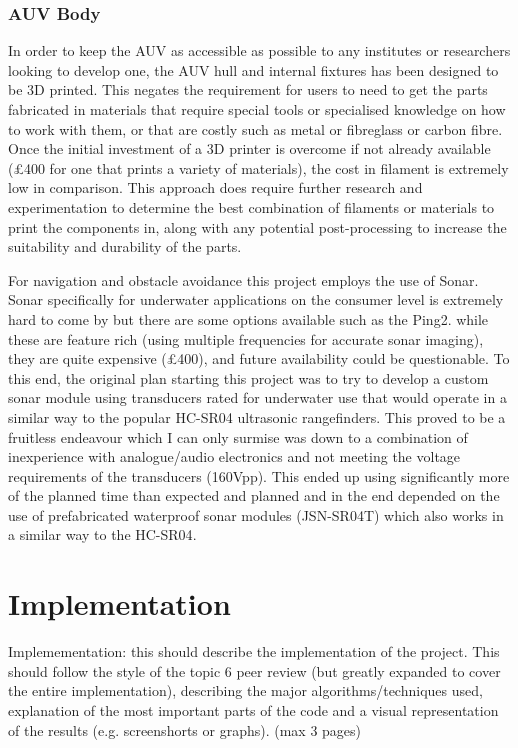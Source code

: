 \documentclass[11pt,a4paper,titlepage]{report}
\begin{document}
	\subsection*{AUV Body}
	In order to keep the AUV as accessible as possible to any institutes or researchers looking to develop one, the AUV hull and internal fixtures has been designed to be 3D printed. This negates the requirement for users to need to get the parts fabricated in materials that require special tools or specialised knowledge on how to work with them, or that are costly such as metal or fibreglass or carbon fibre. Once the initial investment of a 3D printer is overcome if not already available (\unit{\approx}£400 for one that prints a variety of materials), the cost in filament is extremely low in comparison. This approach does require further research and experimentation to determine the best combination of filaments or materials to print the components in, along with any potential post-processing to increase the suitability and durability of the parts. 
	
	For navigation and obstacle avoidance this project employs the use of Sonar. Sonar specifically for underwater applications on the consumer level is extremely hard to come by but there are some options available such as the Ping2\cite{PING2}. while these are feature rich (using multiple frequencies for accurate sonar imaging), they are quite expensive (\unit{\approx}£400), and future availability could be questionable. To this end, the original plan starting this project was to try to develop a custom sonar module using transducers rated for underwater use\cite{ALUMINIUM_TRANSDUCER} that would operate in a similar way to the popular HC-SR04\cite{HC_SR04} ultrasonic rangefinders. This proved to be a fruitless endeavour which I can only surmise was down to a combination of inexperience with analogue/audio electronics and not meeting the voltage requirements of the transducers (160\unit{\volt}pp). This ended up using significantly more of the planned time than expected and planned and in the end depended on the use of prefabricated waterproof sonar modules (JSN-SR04T\cite{JSN_SR04T}) which also works in a similar way to the HC-SR04\cite{HC_SR04}.
	
	\chapter*{Implementation}
	Implemementation: this should describe the implementation of the project. This should follow the style of the topic 6 peer review (but greatly expanded to cover the entire implementation), describing the major algorithms/techniques used, explanation of the most important parts of the code and a visual representation of the results (e.g. screenshorts or graphs). (max 3 pages)
	
\end{document}
